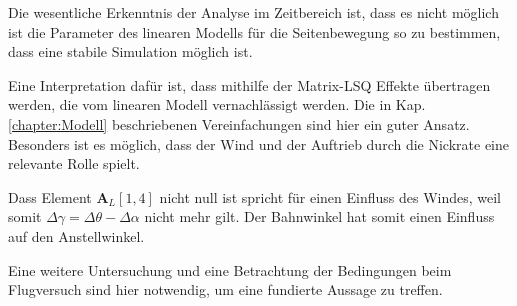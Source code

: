 Die wesentliche Erkenntnis der Analyse im Zeitbereich ist, dass es nicht möglich ist die Parameter des linearen Modells für die Seitenbewegung so zu bestimmen, dass eine stabile Simulation möglich ist.

Eine Interpretation dafür ist, dass mithilfe der Matrix-LSQ Effekte übertragen werden, die vom linearen Modell vernachlässigt werden. Die in Kap. \ref{chapter:Modell} beschriebenen Vereinfachungen sind hier ein guter Ansatz. Besonders ist es möglich, dass der Wind und der Auftrieb durch die Nickrate eine relevante Rolle spielt. 

Dass Element $\textbf{A}_L[1,4]$ nicht null ist spricht für einen Einfluss des Windes, weil somit $\Delta \gamma = \Delta \theta- \Delta \alpha$ nicht mehr gilt. Der Bahnwinkel hat somit einen Einfluss auf den Anstellwinkel.

Eine weitere Untersuchung und eine Betrachtung der Bedingungen beim Flugversuch sind hier notwendig, um eine fundierte Aussage zu treffen.
